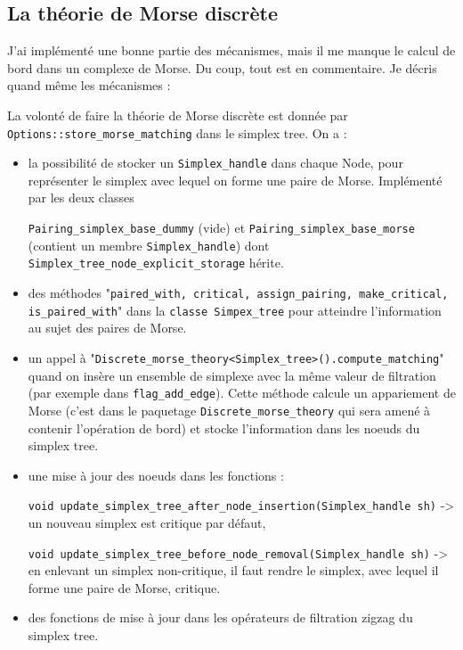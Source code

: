 \documentclass[11pt]{amsart}
\numberwithin{equation}{section}
\theoremstyle{plain}
\theoremstyle{definition}
\begin{document}
\begin{itemize}
\section{La théorie de Morse discrète}

J'ai implémenté une bonne partie des mécanismes, mais il me manque le calcul de bord dans un complexe de Morse. Du coup, tout est en commentaire. Je décris quand même les mécanismes :

La volonté de faire la théorie de Morse discrète est donnée par {\tt Options::store\_morse\_matching} dans le simplex tree. On a :

\begin{itemize}
\item la possibilité de stocker un {\tt Simplex\_handle} dans chaque Node, pour représenter le simplex avec lequel on forme une paire de Morse. Implémenté par les deux classes 

{\tt Pairing\_simplex\_base\_dummy} (vide) et {\tt Pairing\_simplex\_base\_morse} (contient un membre {\tt Simplex\_handle}) dont {\tt Simplex\_tree\_node\_explicit\_storage} hérite.

\item des méthodes "{\tt paired\_with, critical, assign\_pairing, make\_critical, is\_paired\_with}" dans la {\tt classe Simpex\_tree} pour atteindre l'information au sujet des paires de Morse.

\item un appel à "{\tt Discrete\_morse\_theory<Simplex\_tree>().compute\_matching}" quand on insère un ensemble de simplexe avec la même valeur de filtration (par exemple dans {\tt flag\_add\_edge}). Cette méthode calcule un appariement de Morse (c'est dans le paquetage {\tt Discrete\_morse\_theory} qui sera amené à contenir l'opération de bord) et stocke l'information dans les noeuds du simplex tree.

\item une mise à jour des noeuds dans les fonctions :

  {\tt void update\_simplex\_tree\_after\_node\_insertion(Simplex\_handle sh)} -> un nouveau simplex est critique par défaut,

  {\tt void update\_simplex\_tree\_before\_node\_removal(Simplex\_handle sh)} -> en enlevant un simplex non-critique, il faut rendre le simplex, avec lequel il forme une paire de Morse, critique.

\item des fonctions de mise à jour dans les opérateurs de filtration zigzag du simplex tree.




\end{itemize}
\end{itemize}
\end{document}
